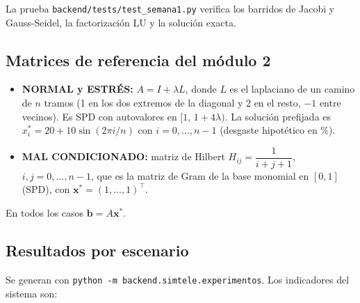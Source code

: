 \documentclass[
  11pt,
  letterpaper,
]{article}
\providecommand{\tightlist}{%
  \setlength{\itemsep}{0pt}\setlength{\parskip}{0pt}}
\begin{document}
La prueba \texttt{backend/tests/test\_semana1.py} verifica los barridos
de Jacobi y Gauss-Seidel, la factorización LU y la solución exacta.

\hypertarget{matrices-de-referencia-del-muxf3dulo-2}{%
\subsection{Matrices de referencia del módulo
2}\label{matrices-de-referencia-del-muxf3dulo-2}}

\begin{itemize}
\tightlist
\item
  \textbf{NORMAL y ESTRÉS:} \(A=I+\lambda L\), donde \(L\) es el
  laplaciano de un camino de \(n\) tramos (1 en los dos extremos de la
  diagonal y 2 en el resto, \(-1\) entre vecinos). Es SPD con
  autovalores en \([1,\,1+4\lambda)\). La solución prefijada es
  \(x_i^{*}=20+10\sin(2\pi i/n)\) con \(i=0,\dots,n-1\) (desgaste
  hipotético en \%).
\item
  \textbf{MAL CONDICIONADO:} matriz de Hilbert
  \(H_{ij}=\dfrac{1}{i+j+1}\), \(i,j=0,\dots,n-1\), que es la matriz de
  Gram de la base monomial en \([0,1]\) (SPD), con
  \(\mathbf{x}^{*}=(1,\dots,1)^{\top}\).
\end{itemize}

En todos los casos \(\mathbf{b}=A\mathbf{x}^{*}\).

\hypertarget{resultados}{%
\subsection{Resultados por escenario}\label{resultados}}

Se generan con \texttt{python\ -m\ backend.simtele.experimentos}. Los
indicadores del sistema son:
\end{document}
